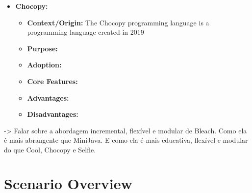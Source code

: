 \begin{itemize}
    \item \textbf{Chocopy:}
    \begin{itemize}
        \item \textbf{Context/Origin:} The Chocopy programming language \cite{padhye2019chocopy} is a programming language created in 2019 
        \item \textbf{Purpose:}
        \item \textbf{Adoption:}
        \item \textbf{Core Features:}
        \item \textbf{Advantages:}
        \item \textbf{Disadvantages:}
    \end{itemize}
    
\end{itemize}

-> Falar sobre a abordagem incremental, flexível e modular de Bleach. Como ela é mais abrangente que MiniJava. E como ela é mais educativa, flexível e modular do que Cool, Chocopy e Selfie.

\section{Scenario Overview}
